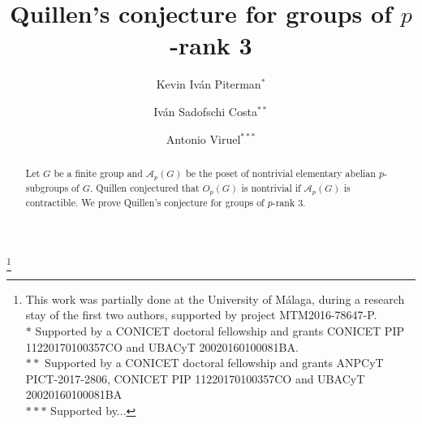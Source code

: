 \documentclass[11pt,twoside,reqno]{amsart}
\theoremstyle{plain}
\theoremstyle{definition}
\theoremstyle{remark}
\def\A{\mathcal{A}}
\begin{document}
\title[Quillen's conjecture for groups of p-rank 3]{Quillen's conjecture for groups of $p$-rank 3}

\author[K.I. Piterman]{Kevin Iv\'an Piterman$^{*}$}
\author[I. Sadofschi Costa]{Iv\'an Sadofschi Costa$^{**}$}
\author[A. Viruel]{Antonio Viruel$^{***}$}

\thanks{This work was partially done at the University of M\'alaga, during a research stay of the first two authors, supported by project MTM2016-78647-P.\\
$*$ Supported by a CONICET doctoral fellowship and grants CONICET PIP 11220170100357CO and UBACyT 20020160100081BA.\\
$**$ Supported by a CONICET doctoral fellowship and grants ANPCyT PICT-2017-2806, CONICET PIP 11220170100357CO and UBACyT 20020160100081BA \\
$***$ Supported by...}

\address{Universidad de Buenos Aires. Facultad de Ciencias Exactas y Naturales. Departamento de Matem\'atica. Buenos Aires, Argentina.}

\address{CONICET-Universidad de Buenos Aires. Instituto de Investigaciones Matem\'aticas Luis A. Santal\'o (IMAS). Buenos Aires, Argentina.}

\address{Departamento de \'Algebra, Geometr\'ia y Topolog\'ia, Universidad de M\'alaga, Campus de Teatinos, 29071 M\'alaga, Spain.}


\begin{abstract}
Let $G$ be a finite group and $\A_p(G)$ be the poset of nontrivial elementary abelian $p$-subgroups of $G$. Quillen conjectured that $O_p(G)$ is nontrivial if $\A_p(G)$ is contractible. We prove Quillen's conjecture for groups of $p$-rank $3$.
\end{abstract}





\maketitle
\end{document}

